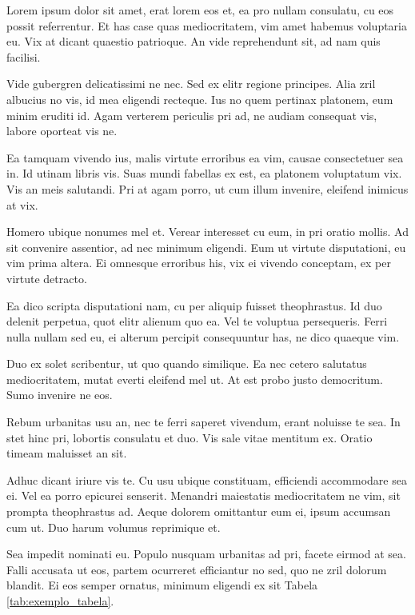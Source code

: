 	Lorem ipsum dolor sit amet, erat lorem eos et, ea pro nullam consulatu, cu eos possit referrentur. Et has case quas mediocritatem, vim amet habemus voluptaria eu. Vix at dicant quaestio patrioque. An vide reprehendunt sit, ad nam quis facilisi.

	Vide gubergren delicatissimi ne nec. Sed ex elitr regione principes. Alia zril albucius no vis, id mea eligendi recteque. Ius no quem pertinax platonem, eum minim eruditi id. Agam verterem periculis pri ad, ne audiam consequat vis, labore oporteat vis ne.

	Ea tamquam vivendo ius, malis virtute erroribus ea vim, causae consectetuer sea in. Id utinam libris vis. Suas mundi fabellas ex est, ea platonem voluptatum vix. Vis an meis salutandi. Pri at agam porro, ut cum illum invenire, eleifend inimicus at vix.

	Homero ubique nonumes mel et. Verear interesset cu eum, in pri oratio mollis. Ad sit convenire assentior, ad nec minimum eligendi. Eum ut virtute disputationi, eu vim prima altera. Ei omnesque erroribus his, vix ei vivendo conceptam, ex per virtute detracto.

	Ea dico scripta disputationi nam, cu per aliquip fuisset theophrastus. Id duo delenit perpetua, quot elitr alienum quo ea. Vel te voluptua persequeris. Ferri nulla nullam sed eu, ei alterum percipit consequuntur has, ne dico quaeque vim.

	Duo ex solet scribentur, ut quo quando similique. Ea nec cetero salutatus mediocritatem, mutat everti eleifend mel ut. At est probo justo democritum. Sumo invenire ne eos.

	Rebum urbanitas usu an, nec te ferri saperet vivendum, erant noluisse te sea. In stet hinc pri, lobortis consulatu et duo. Vis sale vitae mentitum ex. Oratio timeam maluisset an sit.

	Adhuc dicant iriure vis te. Cu usu ubique constituam, efficiendi accommodare sea ei. Vel ea porro epicurei senserit. Menandri maiestatis mediocritatem ne vim, sit prompta theophrastus ad. Aeque dolorem omittantur eum ei, ipsum accumsan cum ut. Duo harum volumus reprimique et.

	Sea impedit nominati eu. Populo nusquam urbanitas ad pri, facete eirmod at sea. Falli accusata ut eos, partem ocurreret efficiantur no sed, quo ne zril dolorum blandit. Ei eos semper ornatus, minimum eligendi ex sit Tabela \ref{tab:exemplo_tabela}.

